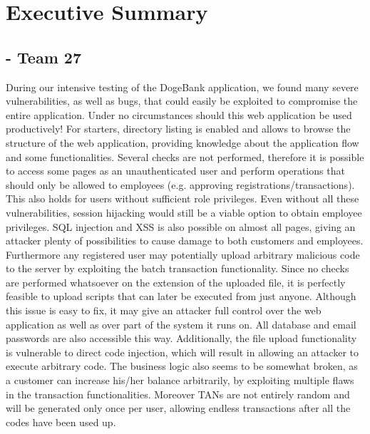 \chapter{Executive Summary}


\section{\doge - Team 27}
During our intensive testing of the DogeBank application, we found many severe vulnerabilities, as well as bugs, that could easily be exploited to compromise the entire application. Under no circumstances should this web application be used 
productively!\newline\newline
For starters, directory listing is enabled and allows to browse the structure of the web application, providing knowledge about the application flow and some functionalities. Several checks are not performed, therefore it is possible to access some pages as an unauthenticated user and perform operations that should only be allowed to employees (e.g. approving registrations/transactions). This also holds for users without sufficient role privileges. Even without all these vulnerabilities, session hijacking would still be a viable option to obtain employee privileges. SQL injection and XSS is also possible on almost all pages, giving an attacker plenty of possibilities to cause damage to both customers and employees.\newline\newline
Furthermore any registered user may potentially upload arbitrary malicious code to the server by exploiting the batch transaction functionality. Since no checks are performed whatsoever on the extension of the uploaded file, it is perfectly feasible to upload scripts that can later be executed from just anyone. Although this issue is easy to fix, it may give an attacker full control over the web application as well as over part of the system it runs on. All database and email passwords are also accessible this way. Additionally, the file upload functionality is vulnerable to direct code injection, which will result in allowing an attacker to execute arbitrary code.\newline\newline 
The business logic also seems to be somewhat broken, as a customer can increase his/her balance arbitrarily, by exploiting multiple flaws in the transaction functionalities. Moreover TANs are not entirely random and will be generated only once per user, allowing endless transactions after all the codes have been used up.

